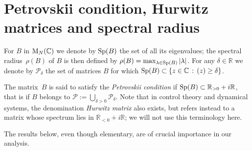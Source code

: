 \documentclass[JEP,XML,SOM,Unicode,published]{cedram}
\let\Re\relax
\DeclareMathOperator{\Re}{Re}
\theoremstyle{definition}
\newcommand\R{\mathbb{R}}
\begin{document}
\section{Petrovskii condition, Hurwitz matrices and spectral radius}\label{appendix:petrovskii}

For $B$ in $\textnormal{M}_N(\mathbb{C})$ we denote by $\textnormal{Sp}(B)$ the set of all its eigenvalues; the spectral radius~$\rho(B)$ of $B$ is then defined by $\rho(B) = \max_{\lambda\in \textnormal{Sp}(B)} |\lambda|$. For any $\delta\in\R$ we denote by $\mathscr{P}_{\delta}$ the set of matrices $B$ for which $\textnormal{Sp}(B)\subset\{z\in\mathbb{C}\,:\,\Re(z)\geq \delta\}$.

The matrix~$B$ is said to satisfy the \emph{Petrovskii condition} if $\textnormal{Sp}(B)\subset \R_{>0}+i\R$, that is if $B$ belongs to $\mathscr{P}:=\bigcup_{\delta>0} \mathscr{P}_\delta$. Note that in control theory and dynamical systems, the denomination \emph{Hurwitz matrix} also exists, but refers instead to a matrix whose spectrum lies in $\R_{<0}+i\R$; we will not use this terminology here.

The results below, even though elementary, are of crucial importance in our analysis.
\end{document}

